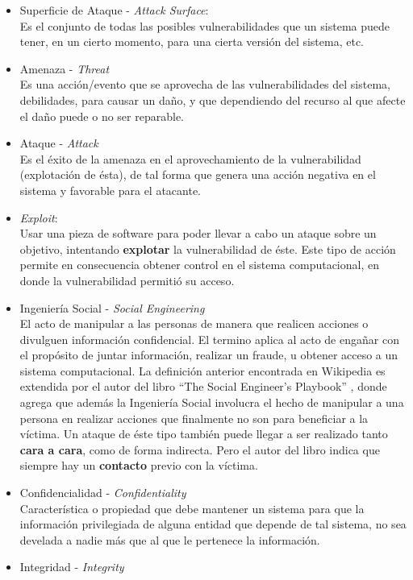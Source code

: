 \begin{itemize}
    \item Superficie de Ataque - \textit{Attack Surface}:
        \\Es el conjunto de todas las posibles vulnerabilidades que un sistema puede tener, en un cierto momento, para una cierta versión del sistema, etc.
    \item Amenaza - \textit{Threat}
        \\Es una acción/evento que se aprovecha de las vulnerabilidades del sistema, debilidades, para causar un daño, y que dependiendo del recurso al que afecte el daño puede o no ser reparable.
    \item Ataque - \textit{Attack}
        \\Es el éxito de la amenaza en el aprovechamiento de la vulnerabilidad (explotación de ésta), de tal forma que genera una acción negativa en el sistema y favorable para el atacante.
    \item \textit{Exploit}:
        \\Usar una pieza de software para poder llevar a cabo un ataque sobre un objetivo, intentando \textbf{explotar} la vulnerabilidad de éste. Este tipo de acción permite en consecuencia obtener control en el sistema computacional, en donde la vulnerabilidad permitió su acceso.
    \item Ingeniería Social - \textit{Social Engineering}
        \\El acto de manipular a las personas de manera que realicen acciones o divulguen información confidencial. El termino aplica al acto de engañar con el propósito de juntar información, realizar un fraude, u obtener acceso a un sistema computacional. La definición anterior encontrada en Wikipedia es extendida por el autor del libro ``The Social Engineer's Playbook'' \cite{socEngineeering}, donde agrega que además la Ingeniería Social involucra el hecho de manipular a una persona en realizar acciones que finalmente no son para beneficiar a la víctima. Un ataque de éste tipo también puede llegar a ser realizado tanto \textbf{cara a cara}, como de forma indirecta. Pero el autor del libro indica que siempre hay un \textbf{contacto} previo con la víctima.
    \item Confidencialidad - \textit{Confidentiality} 
        \\Característica o propiedad que debe mantener un sistema para que la información privilegiada de alguna entidad que depende de tal sistema, no sea develada a nadie más que al que le pertenece la información.
    \item Integridad - \textit{Integrity}

\end{itemize}
